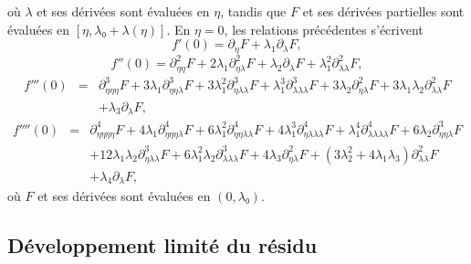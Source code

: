 \documentclass{article}
\begin{document}
où $λ$ et ses dérivées sont évaluées en $η$,
tandis que $F$ et ses dérivées partielles sont évaluées en
$[η, λ₀ + λ (η)]$. En $η = 0$, les relations
précédentes s'écrivent
\begin{equation}
  \label{eq20220107060454} f' (0) = \partial_{η} F + λ_1
  \partial_{λ} F,
\end{equation}
\begin{equation}
  \label{eq20220107124311} f'' (0) = \partial_{η  η}^2 F + 2
  λ_1 \partial_{η  λ}^2 F + λ_2
  \partial_{λ} F + λ_1^2 \partial_{λ  λ}^2 F,
\end{equation}
\begin{eqnarray}
  f''' (0) & = & \partial_{η  η  η}^3 F + 3 λ_1
  \partial_{η  η  λ}^3 F + 3 λ_1^2
  \partial_{η  λ  λ}^3 F + λ_1^3
  \partial_{λ  λ  λ}^3 F + 3 λ_2
  \partial_{η  λ}^2 F + 3 λ_1 λ_2
  \partial_{λ  λ}^2 F \nonumber\\
  &  &  + λ_3 \partial_{λ} F,  \label{eq20220107060500}
\end{eqnarray}
\begin{eqnarray}
  f'''' (0) & = & \partial_{η  η  η  η}^4
  F + 4 λ_1 \partial_{η  η  η
  λ}^4 F + 6 λ_1^2 \partial_{η  η  λ
   λ}^4 F + 4 λ_1^3 \partial_{η  λ
   λ  λ}^4 F + λ_1^4 \partial_{λ
   λ  λ  λ}^4 F + 6 λ_2
  \partial_{η  η  λ}^3 F \nonumber\\
  &  & + 12 λ_1 λ_2 \partial_{η  λ
  λ}^3 F + 6 λ_1^2 λ_2 \partial_{λ  λ
   λ}^3 F + 4 λ_3 \partial_{η  λ}^2 F +
  (3 λ_2^2 + 4 λ_1 λ_3) \partial_{λ
  λ}^2 F \nonumber\\
  &  & + λ_4 \partial_{λ} F,
\end{eqnarray}
où $F$ et ses dérivées sont évaluées en $(0, λ₀)$.

\subsection{Développement limité du
résidu}\label{sec20211112182000}
\end{document}
